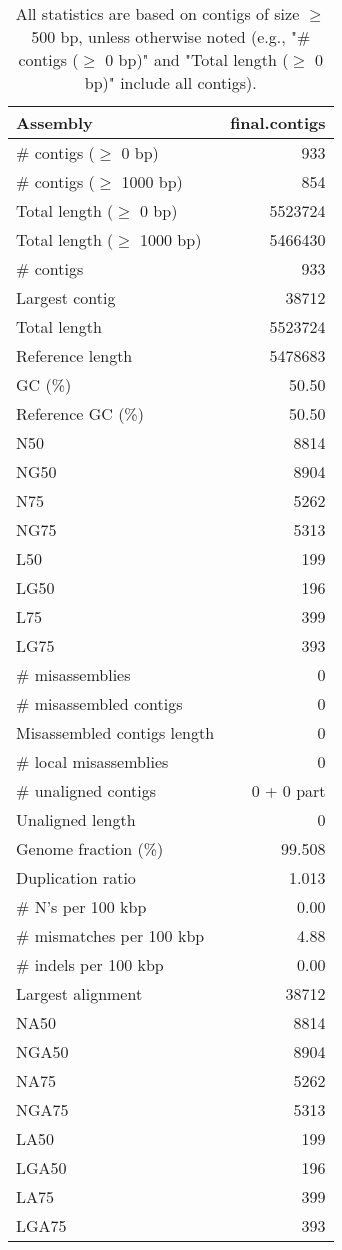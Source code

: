 \documentclass[12pt,a4paper]{article}
\begin{document}
\begin{table}[ht]
\begin{center}
\caption{All statistics are based on contigs of size $\geq$ 500 bp, unless otherwise noted (e.g., "\# contigs ($\geq$ 0 bp)" and "Total length ($\geq$ 0 bp)" include all contigs).}
\begin{tabular}{|l*{1}{|r}|}
\hline
Assembly & final.contigs \\ \hline
\# contigs ($\geq$ 0 bp) & 933 \\ \hline
\# contigs ($\geq$ 1000 bp) & 854 \\ \hline
Total length ($\geq$ 0 bp) & 5523724 \\ \hline
Total length ($\geq$ 1000 bp) & 5466430 \\ \hline
\# contigs & 933 \\ \hline
Largest contig & 38712 \\ \hline
Total length & 5523724 \\ \hline
Reference length & 5478683 \\ \hline
GC (\%) & 50.50 \\ \hline
Reference GC (\%) & 50.50 \\ \hline
N50 & 8814 \\ \hline
NG50 & 8904 \\ \hline
N75 & 5262 \\ \hline
NG75 & 5313 \\ \hline
L50 & 199 \\ \hline
LG50 & 196 \\ \hline
L75 & 399 \\ \hline
LG75 & 393 \\ \hline
\# misassemblies & 0 \\ \hline
\# misassembled contigs & 0 \\ \hline
Misassembled contigs length & 0 \\ \hline
\# local misassemblies & 0 \\ \hline
\# unaligned contigs & 0 + 0 part \\ \hline
Unaligned length & 0 \\ \hline
Genome fraction (\%) & 99.508 \\ \hline
Duplication ratio & 1.013 \\ \hline
\# N's per 100 kbp & 0.00 \\ \hline
\# mismatches per 100 kbp & 4.88 \\ \hline
\# indels per 100 kbp & 0.00 \\ \hline
Largest alignment & 38712 \\ \hline
NA50 & 8814 \\ \hline
NGA50 & 8904 \\ \hline
NA75 & 5262 \\ \hline
NGA75 & 5313 \\ \hline
LA50 & 199 \\ \hline
LGA50 & 196 \\ \hline
LA75 & 399 \\ \hline
LGA75 & 393 \\ \hline
\end{tabular}
\end{center}
\end{table}
\end{document}
